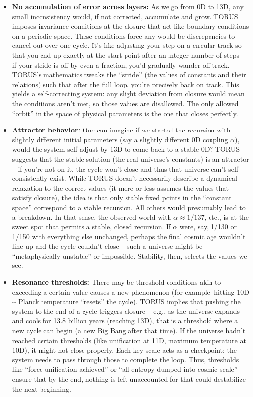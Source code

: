 \documentclass[]{article}
\begin{document}
\begin{itemize}
\item
  \textbf{No accumulation of error across layers:} As we go from 0D to
  13D, any small inconsistency would, if not corrected, accumulate and
  grow. TORUS imposes invariance conditions at the closure that act like
  boundary conditions on a periodic space​. These conditions force any
  would-be discrepancies to cancel out over one cycle. It's like
  adjusting your step on a circular track so that you end up exactly at
  the start point after an integer number of steps -- if your stride is
  off by even a fraction, you'd gradually wander off track. TORUS's
  mathematics tweaks the ``stride'' (the values of constants and their
  relations) such that after the full loop, you're precisely back on
  track. This yields a self-correcting system: any slight deviation from
  closure would mean the conditions aren't met, so those values are
  disallowed. The only allowed ``orbit'' in the space of physical
  parameters is the one that closes perfectly.
\item
  \textbf{Attractor behavior:} One can imagine if we started the
  recursion with slightly different initial parameters (say a slightly
  different 0D coupling $\alpha$), would the system self-adjust by 13D to come
  back to a stable 0D? TORUS suggests that the stable solution (the real
  universe's constants) is an attractor -- if you're not on it, the
  cycle won't close and thus that universe can't self-consistently
  exist. While TORUS doesn't necessarily describe a dynamical relaxation
  to the correct values (it more or less assumes the values that satisfy
  closure), the idea is that only stable fixed points in the ``constant
  space'' correspond to a viable recursion. All others would presumably
  lead to a breakdown. In that sense, the observed world with $\alpha \approx 1/137$,
  etc., is at the sweet spot that permits a stable, closed recursion. If
  $\alpha$ were, say, 1/130 or 1/150 with everything else unchanged, perhaps
  the final cosmic age wouldn't line up and the cycle couldn't close --
  such a universe might be ``metaphysically unstable'' or impossible.
  Stability, then, selects the values we see.
\item
  \textbf{Resonance thresholds:} There may be threshold conditions akin
  to exceeding a certain value causes a new phenomenon (for example,
  hitting 10D \textasciitilde{} Planck temperature ``resets'' the
  cycle). TORUS implies that pushing the system to the end of a cycle
  triggers closure -- e.g., as the universe expands and cools for 13.8
  billion years (reaching 13D), that is a threshold where a new cycle
  can begin (a new Big Bang after that time). If the universe hadn't
  reached certain thresholds (like unification at 11D, maximum
  temperature at 10D), it might not close properly. Each key scale acts
  as a checkpoint: the system needs to pass through those to complete
  the loop. Thus, thresholds like ``force unification achieved'' or
  ``all entropy dumped into cosmic scale'' ensure that by the end,
  nothing is left unaccounted for that could destabilize the next
  beginning.
\end{itemize}
\end{document}
